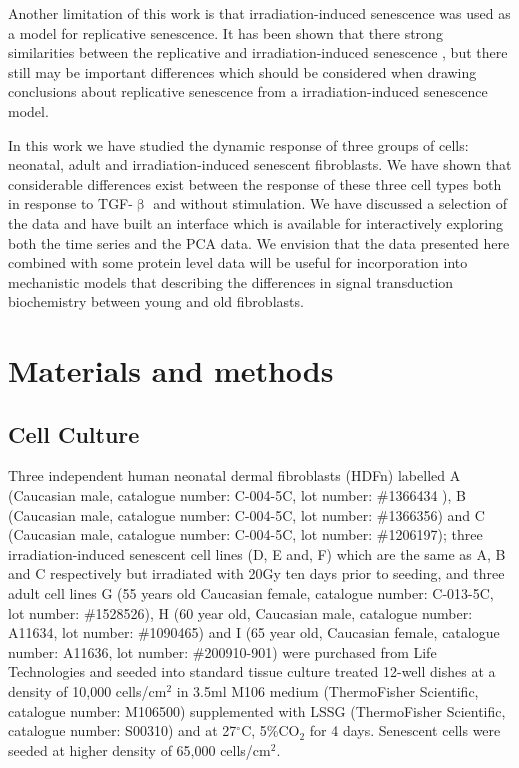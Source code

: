 \documentclass[alpha-refs]{wiley-article}
\newcommand{\tgf}{TGF-$\upbeta$}
\begin{document}
Another limitation of this work is that irradiation-induced senescence was used as a model for replicative senescence. It has been shown that there strong similarities between the replicative and irradiation-induced senescence \citep{Marthandan2016}, but there still may be important differences which should be considered when drawing conclusions about replicative senescence from a irradiation-induced senescence model. 

In this work we have studied the dynamic response of three groups of cells: neonatal, adult and irradiation-induced senescent fibroblasts. We have shown that considerable differences exist between the response of these three cell types both in response to \tgf{} and without stimulation. We have discussed a selection of the data and have built an interface which is available for interactively exploring both the time series and the PCA data. We envision that the data presented here combined with some protein level data will be useful for incorporation into mechanistic models that describing the differences in signal transduction biochemistry between young and old fibroblasts.

\section{Materials and methods}
\subsection{Cell Culture}
Three independent human neonatal dermal fibroblasts (HDFn) labelled A (Caucasian male, catalogue number: C-004-5C, lot number: \#1366434 ), B (Caucasian male, catalogue number: C-004-5C, lot number: \#1366356) and C (Caucasian male, catalogue number: C-004-5C, lot number: \#1206197); three irradiation-induced senescent cell lines (D, E and, F) which are the same as A, B and C respectively but irradiated with 20Gy ten days prior to seeding, and three adult cell lines G (55 years old Caucasian female, catalogue number: C-013-5C, lot number: \#1528526), H (60 year old, Caucasian male, catalogue number: A11634, lot number: \#1090465) and I (65 year old, Caucasian female, catalogue number: A11636, lot number: \#200910-901) were purchased from Life Technologies and seeded into standard tissue culture treated 12-well dishes at a density of 10,000 cells/cm$^2$ in 3.5ml M106 medium (ThermoFisher Scientific, catalogue number: M106500) supplemented with LSSG (ThermoFisher Scientific, catalogue number: S00310) and at 27$^{\circ}$C, 5\%CO$_2$ for 4 days. Senescent cells were seeded at higher density of 65,000 cells/cm$^2$.
%
\end{document}
